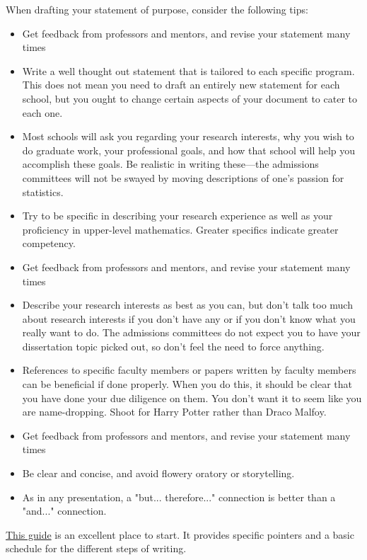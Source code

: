 \documentclass[11pt]{article}
\begin{document}
When drafting your statement of purpose, consider the following tips:
\begin{itemize}
\item Get feedback from professors and mentors, and revise your statement many times
\item Write a well thought out statement that is tailored to each specific program. This does not mean you need to draft an entirely new statement for each school, but you ought to change certain aspects of your document to cater to each one.
\item Most schools will ask you regarding your research interests, why you wish to do graduate work, your professional goals, and how that school will help you accomplish these goals. Be realistic in writing these—the admissions committees will not be swayed by moving descriptions of one’s passion for statistics.
\item Try to be specific in describing your research experience as well as your proficiency in upper-level mathematics. Greater specifics indicate greater competency.
\item Get feedback from professors and mentors, and revise your statement many times
\item Describe your research interests as best as you can, but don’t talk too much about research interests if you don’t have any or if you don’t know what you really want to do. The admissions committees do not expect you to have your dissertation topic picked out, so don’t feel the need to force anything.
\item References to specific faculty members or papers written by faculty members can be beneficial if done properly. When you do this, it should be clear that you have done your due diligence on them. You don’t want it to seem like you are name-dropping. Shoot for Harry Potter rather than Draco Malfoy.
\item Get feedback from professors and mentors, and revise your statement many times
\item Be clear and concise, and avoid flowery oratory or storytelling.
\item As in any presentation, a "but... therefore..." connection is better than a "and..." connection.
\end{itemize}

\href{https://www.study-abroad.org/blog/statement-of-purpose-guide/}{This guide} is an excellent place to start. It provides specific pointers and a basic schedule for the different steps of writing.
\end{document}
